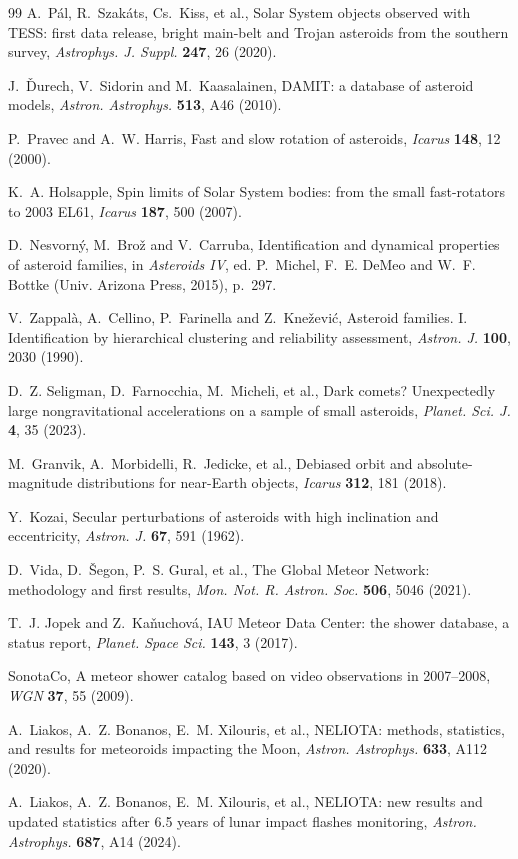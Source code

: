 \documentclass[3p,11pt]{elsarticle}
\begin{document}
\begin{thebibliography}{99}
A.~P\'al, R.~Szak\'ats, Cs.~Kiss, et al., Solar System objects observed with TESS: first
data release, bright main-belt and Trojan asteroids from the southern survey,
\emph{Astrophys. J. Suppl.} \textbf{247}, 26 (2020).

J.~\v{D}urech, V.~Sidorin and M.~Kaasalainen, DAMIT: a database of asteroid models,
\emph{Astron. Astrophys.} \textbf{513}, A46 (2010).

P.~Pravec and A.~W. Harris, Fast and slow rotation of asteroids, \emph{Icarus}
\textbf{148}, 12 (2000).

K.~A. Holsapple, Spin limits of Solar System bodies: from the small fast-rotators to
2003 EL61, \emph{Icarus} \textbf{187}, 500 (2007).

D.~Nesvorn\'y, M.~Bro\v{z} and V.~Carruba, Identification and dynamical properties of
asteroid families, in \emph{Asteroids IV}, ed. P.~Michel, F.~E. DeMeo and W.~F. Bottke
(Univ. Arizona Press, 2015), p.~297.

V.~Zappal\`a, A.~Cellino, P.~Farinella and Z.~Kne\v{z}evi\'c, Asteroid families. I.
Identification by hierarchical clustering and reliability assessment, \emph{Astron. J.}
\textbf{100}, 2030 (1990).

D.~Z. Seligman, D.~Farnocchia, M.~Micheli, et al., Dark comets? Unexpectedly large
nongravitational accelerations on a sample of small asteroids, \emph{Planet. Sci. J.}
\textbf{4}, 35 (2023).

M.~Granvik, A.~Morbidelli, R.~Jedicke, et al., Debiased orbit and absolute-magnitude
distributions for near-Earth objects, \emph{Icarus} \textbf{312}, 181 (2018).

Y.~Kozai, Secular perturbations of asteroids with high inclination and eccentricity,
\emph{Astron. J.} \textbf{67}, 591 (1962).

D.~Vida, D.~\v{S}egon, P.~S. Gural, et al., The Global Meteor Network: methodology and
first results, \emph{Mon. Not. R. Astron. Soc.} \textbf{506}, 5046 (2021).

T.~J. Jopek and Z.~Ka\v{n}uchov\'a, IAU Meteor Data Center: the shower database, a status
report, \emph{Planet. Space Sci.} \textbf{143}, 3 (2017).

SonotaCo, A meteor shower catalog based on video observations in 2007--2008,
\emph{WGN} \textbf{37}, 55 (2009).

A.~Liakos, A.~Z. Bonanos, E.~M. Xilouris, et al., NELIOTA: methods, statistics, and
results for meteoroids impacting the Moon, \emph{Astron. Astrophys.} \textbf{633}, A112
(2020).

A.~Liakos, A.~Z. Bonanos, E.~M. Xilouris, et al., NELIOTA: new results and updated
statistics after 6.5 years of lunar impact flashes monitoring, \emph{Astron. Astrophys.}
\textbf{687}, A14 (2024).

\end{thebibliography}
\end{document}
